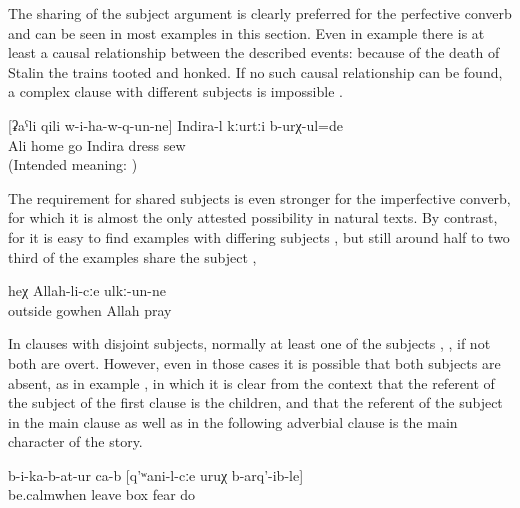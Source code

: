 The sharing of the subject argument is clearly preferred for the perfective converb and can be seen in most examples in this section. Even in example  there is at least a causal relationship between the described events: because of the death of Stalin the trains tooted and honked. If no such causal relationship can be found, a complex clause with different subjects is impossible .
%
\begin{exe}
	\ex	\label{ex:When Ali came home, Indira was sewing a dress}
		[ʡaˁli	qili	w-i-ha-w-q-un-ne]	Indira-l	kːurtːi	b-urχ-ul=de\\
		{}	Ali	home	go	Indira	dress	sew\\
	\glt	(Intended meaning: )
\end{exe}

The requirement for shared subjects is even stronger for the imperfective converb, for which it is almost the only attested possibility in natural texts. By contrast, for  it is easy to find examples with differing subjects , but still around half to two third of the examples share the subject , 
%
\begin{exe}
	\ex	\label{ex:‎When he left, he prayed to Allah}
	\gll	[tːura	sa-w-q-un=qːel]	heχ	Allah-li-cːe	ulkː-un-ne\\
		outside	gowhen		Allah	pray\\
	\glt	{}
\end{exe}

In clauses with disjoint subjects, normally at least one of the subjects , , if not both are overt. However, even in those cases it is possible that both subjects are absent, as in example , in which it is clear from the context that the referent of the subject of the first clause is the children, and that the referent of the subject in the main clause as well as in the following adverbial clause is the main character of the story.
%
\begin{exe}
	\ex	\label{ex:‎When they did not calm down, (he) put them into the box, frightening them}
	\gll	[a-b-ug-an=qːel]	b-i-ka-b-at-ur	ca-b	[q'ʷani-l-cːe	uruχ	b-arq'-ib-le]\\
		be.calmwhen	leave		box	fear	do\\
	\glt	{}
\end{exe}

